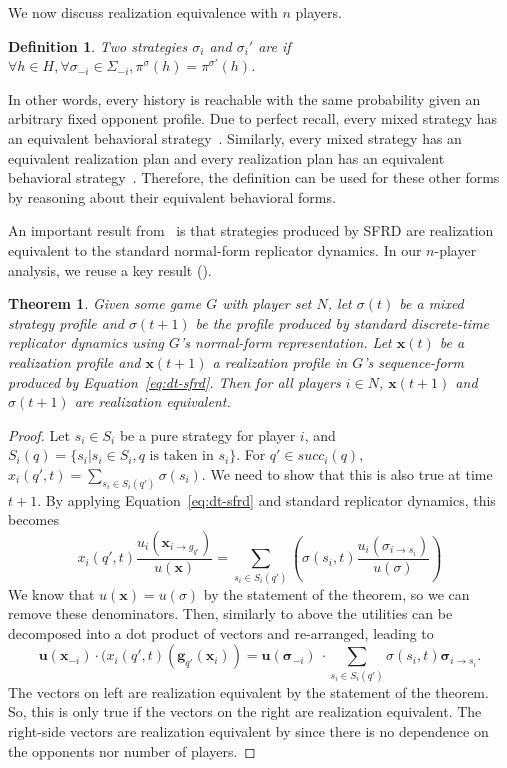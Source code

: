 \documentclass{aamas2014}
\newcommand{\bx}{\mathbf{x}}
\newcommand{\bg}{\mathbf{g}}
\newcommand{\bu}{\mathbf{u}}
\newcommand{\defword}[1]{\textbf{\boldmath{#1}}}
\newtheorem{definition}{Definition}
\newtheorem{theorem}{Theorem}
\newcommand{\todo}[1]{{\color{red}{\bf #1}}}
\begin{document}
\noindent We now discuss realization equivalence with $n$ players. 
\begin{definition}
Two strategies $\sigma_i$ and $\sigma_i'$ are \defword{realization equivalent} if 
$\forall h \in H, \forall \sigma_{-i} \in \Sigma_{-i}, \pi^{\sigma}(h) = \pi^{\sigma'}(h)$. 
\end{definition}
In other words, every history is reachable with the same probability given an arbitrary fixed opponent profile. 
Due to perfect recall, every mixed strategy has an equivalent behavioral strategy~\cite{Kuhn53}. 
Similarly, every mixed strategy has an equivalent realization plan and every realization plan has 
an equivalent behavioral strategy~\cite{SequenceFormLPs}. Therefore, the definition can be used for these 
other forms by reasoning about their equivalent behavioral forms. 

An important result from~\cite{Gatti13Efficient} is that strategies produced by SFRD are realization equivalent 
to the standard normal-form replicator dynamics. In our $n$-player analysis, we reuse a key result 
(\cite[Lemma 9]{Gatti13Efficient}).

\begin{theorem}
Given some game $G$ with player set $N$, 
let $\sigma(t)$ be a mixed strategy profile and $\sigma(t+1)$ be the profile produced by 
standard discrete-time replicator dynamics using $G$'s normal-form representation. 
Let $\bx(t)$ be a realization profile and $\bx(t+1)$ a realization profile in $G$'s sequence-form produced by 
Equation~\ref{eq:dt-sfrd}. Then for all players $i \in N$, $\bx(t+1)$ and $\sigma(t+1)$ are realization equivalent.
\end{theorem}
\begin{proof}
Let $s_i \in S_i$ be a pure strategy for player $i$, and $S_i(q) = \{ s_i | s_i \in S_i, q \mbox{ is taken in } s_i \}$.
For $q' \in succ_i(q)$, $x_i(q', t) = \sum_{s_i \in S_i(q')} \sigma(s_i)$. 
We need to show that this is also true at time $t+1$. By applying Equation~\ref{eq:dt-sfrd} and standard
replicator dynamics, this becomes
\[
  x_i(q',t) \frac{u_i(\bx_{i \rightarrow g_{q'}})}{u(\bx)} 
= \sum_{s_i \in S_i(q')} \left( \sigma(s_i,t) \frac{u_i(\sigma_{i \rightarrow s_i})}{u(\sigma)} \right)
\]
We know that $u(\bx) = u(\sigma)$ by the statement of the theorem, so we can remove these denominators.
Then, similarly to above the utilities can be decomposed into a dot product of vectors and re-arranged, leading to
\[
  \bu(\bx_{-i}) \cdot (x_i(q',t)(\bg_{q'}(\bx_i)) 
= \bu(\boldsymbol\sigma_{-i})~\cdot \sum_{s_i \in S_i(q')} \sigma(s_i,t) \boldsymbol\sigma_{i \rightarrow s_i}.
\]
\noindent The vectors on left are realization equivalent by the statement of the theorem. So, this 
is only true if the vectors on the right are realization equivalent. The right-side vectors are realization equivalent 
by \cite[Lemma 9]{Gatti13Efficient} since there is no dependence on the opponents nor number of players. 
\end{proof}
\end{document}
